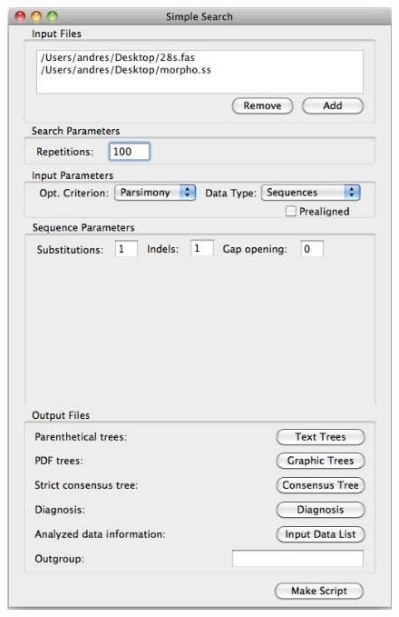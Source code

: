 \begin{figure}
\centering
\begin{minipage}[c]{0.45\textwidth}
   		\includegraphics[width=\textwidth]{doc/figures/simplesearch_window_filled.jpg}
\end{minipage}
\,
\begin{minipage}[c]{0.52\textwidth}

\end{minipage}
\end{figure}
